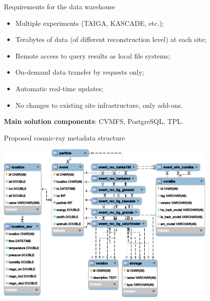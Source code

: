 
\begin{frame}{Requirements for the data warehouse}
  \begin{itemize}
    \item Multiple experiments (TAIGA, KASCADE, etc.);
    \item Terabytes of data (of different reconstruction level) at each site;
    \item Remote access to query results as local file systems;
    \item  On-demand data transfer by requests only;
    \item  Automatic real-time updates;
    \item  No changes to existing site infrastructure, only add-ons.
  \end{itemize}
  \vspace{1em}
  \textbf{Main solution components}: CVMFS, PostgreSQL, TPL.
\end{frame}

\begin{frame}{Proposed cosmic-ray metadata structure}
    \vspace{-1.5em}
    \begin{center}
        \includegraphics[width=0.82\textwidth]{pics/metadata.pdf}
    \end{center}
\end{frame}
